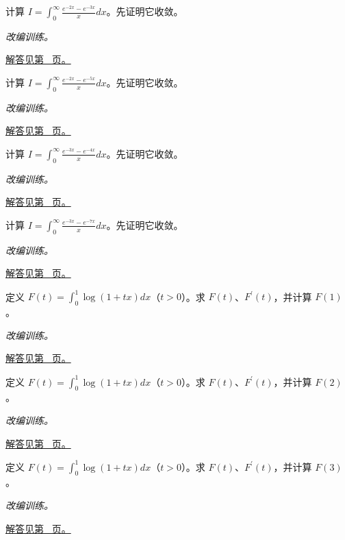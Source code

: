 \documentclass[12pt,fontset=fandol]{ctexart}
\begin{document}
\begin{example}[两个衰减指数的消差]\label{ex:c20q15}
计算 $I=\displaystyle\int_0^\infty\frac{e^{-2x}-e^{-3x}}x dx$。先证明它收敛。
\par\textit{改编训练。}\par\hyperref[ans:c20q15]{解答见第~\pageref{ans:c20q15} 页。}
\end{example}
\begin{example}[两个衰减指数的消差]\label{ex:c20q16}
计算 $I=\displaystyle\int_0^\infty\frac{e^{-2x}-e^{-5x}}x dx$。先证明它收敛。
\par\textit{改编训练。}\par\hyperref[ans:c20q16]{解答见第~\pageref{ans:c20q16} 页。}
\end{example}
\begin{example}[两个衰减指数的消差]\label{ex:c20q17}
计算 $I=\displaystyle\int_0^\infty\frac{e^{-3x}-e^{-4x}}x dx$。先证明它收敛。
\par\textit{改编训练。}\par\hyperref[ans:c20q17]{解答见第~\pageref{ans:c20q17} 页。}
\end{example}
\begin{example}[两个衰减指数的消差]\label{ex:c20q18}
计算 $I=\displaystyle\int_0^\infty\frac{e^{-3x}-e^{-7x}}x dx$。先证明它收敛。
\par\textit{改编训练。}\par\hyperref[ans:c20q18]{解答见第~\pageref{ans:c20q18} 页。}
\end{example}
\begin{example}[简单含参积分的求导]\label{ex:c20q19}
定义 $F(t)=\int_0^1\log(1+tx)dx$（$t>0$）。求 $F(t)$、$F^{\prime}(t)$，并计算 $F(1)$。
\par\textit{改编训练。}\par\hyperref[ans:c20q19]{解答见第~\pageref{ans:c20q19} 页。}
\end{example}
\begin{example}[简单含参积分的求导]\label{ex:c20q20}
定义 $F(t)=\int_0^1\log(1+tx)dx$（$t>0$）。求 $F(t)$、$F^{\prime}(t)$，并计算 $F(2)$。
\par\textit{改编训练。}\par\hyperref[ans:c20q20]{解答见第~\pageref{ans:c20q20} 页。}
\end{example}
\begin{example}[简单含参积分的求导]\label{ex:c20q21}
定义 $F(t)=\int_0^1\log(1+tx)dx$（$t>0$）。求 $F(t)$、$F^{\prime}(t)$，并计算 $F(3)$。
\par\textit{改编训练。}\par\hyperref[ans:c20q21]{解答见第~\pageref{ans:c20q21} 页。}
\end{example}
\end{document}
